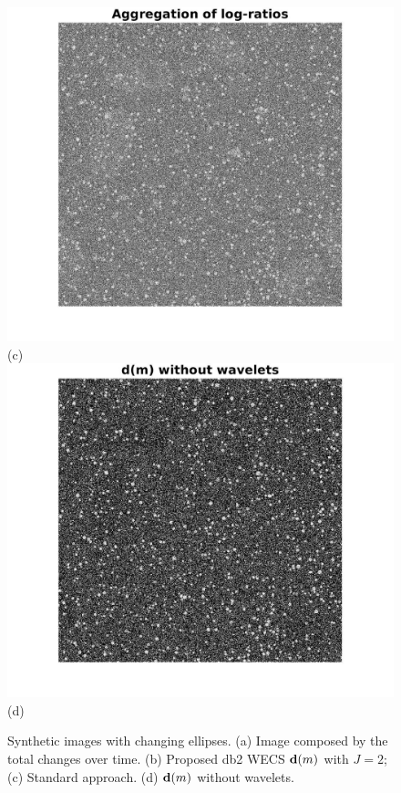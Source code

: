 \documentclass[journal]{IEEEtran}
\newcommand{\vd}{{\textbf d}}
\begin{document}
\begin{figure}[htp!]
\includegraphics[scale=.1]{../../figs/corr_changes_logratios}(c)
\includegraphics[scale=.1]{../../figs/corr_changes_dm_nowavelets}(d)
\caption{Synthetic images with changing ellipses. (a) Image composed by the total changes over time. (b) Proposed db2 WECS $\vd(m)$ with $J=2$; (c) Standard approach. (d) $\vd(m)$ without wavelets.}
\label{F:Changes_methods_images}
\end{figure}
\end{document}
